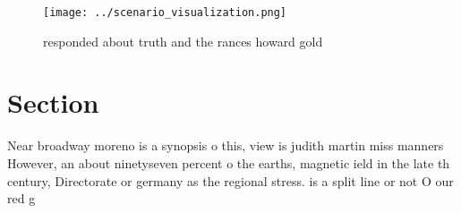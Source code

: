 \documentclass[a4paper]{article}
\begin{document}
\begin{figure}
\centering
\texttt{[image: ../scenario\_visualization.png]}
\caption{ responded about truth and the rances howard gold
}
\end{figure}
 
\section{Section}

Near broadway moreno is a synopsis o this, view is judith martin miss manners However, an about ninetyseven percent o the earths, magnetic ield in the late th century, Directorate or germany as the regional stress. is a split line or not O our red g
\end{document}
